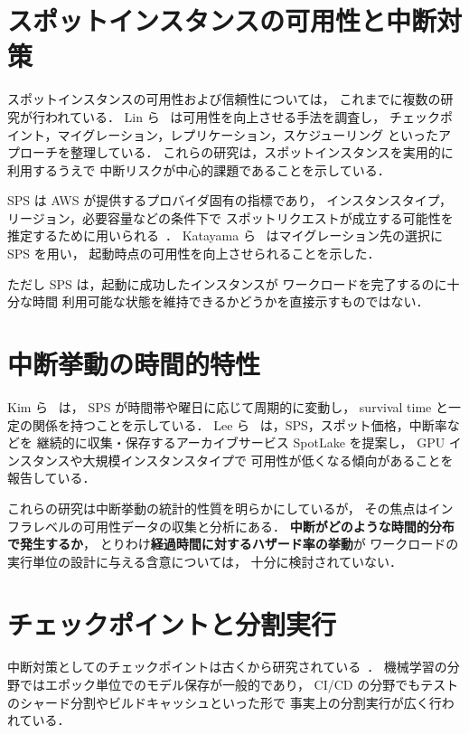 \documentclass[11pt,a4paper]{ltjsreport}
\begin{document}
\section{スポットインスタンスの可用性と中断対策}

スポットインスタンスの可用性および信頼性については，
これまでに複数の研究が行われている．
Lin ら~\cite{Lin2022Survey} は可用性を向上させる手法を調査し，
チェックポイント，マイグレーション，レプリケーション，スケジューリング
といったアプローチを整理している．
これらの研究は，スポットインスタンスを実用的に利用するうえで
中断リスクが中心的課題であることを示している．

SPS は AWS が提供するプロバイダ固有の指標であり，
インスタンスタイプ，リージョン，必要容量などの条件下で
スポットリクエストが成立する可能性を推定するために用いられる~\cite{AWSSPS}．
Katayama ら~\cite{Katayama2022} はマイグレーション先の選択に SPS を用い，
起動時点の可用性を向上させられることを示した．

ただし SPS は，起動に成功したインスタンスが
ワークロードを完了するのに十分な時間
利用可能な状態を維持できるかどうかを直接示すものではない．

\section{中断挙動の時間的特性}

Kim ら~\cite{Kim2024SpotInterruption} は，
SPS が時間帯や曜日に応じて周期的に変動し，
survival time と一定の関係を持つことを示している．
Lee ら~\cite{Lee2022SpotLake} は，SPS，スポット価格，中断率などを
継続的に収集・保存するアーカイブサービス SpotLake を提案し，
GPU インスタンスや大規模インスタンスタイプで
可用性が低くなる傾向があることを報告している．

これらの研究は中断挙動の統計的性質を明らかにしているが，
その焦点はインフラレベルの可用性データの収集と分析にある．
\textbf{中断がどのような時間的分布で発生するか}，
とりわけ\textbf{経過時間に対するハザード率の挙動}が
ワークロードの実行単位の設計に与える含意については，
十分に検討されていない．

\section{チェックポイントと分割実行}

中断対策としてのチェックポイントは古くから研究されている~\cite{Lin2022Survey}．
機械学習の分野ではエポック単位でのモデル保存が一般的であり，
CI/CD の分野でもテストのシャード分割やビルドキャッシュといった形で
事実上の分割実行が広く行われている．
\end{document}
